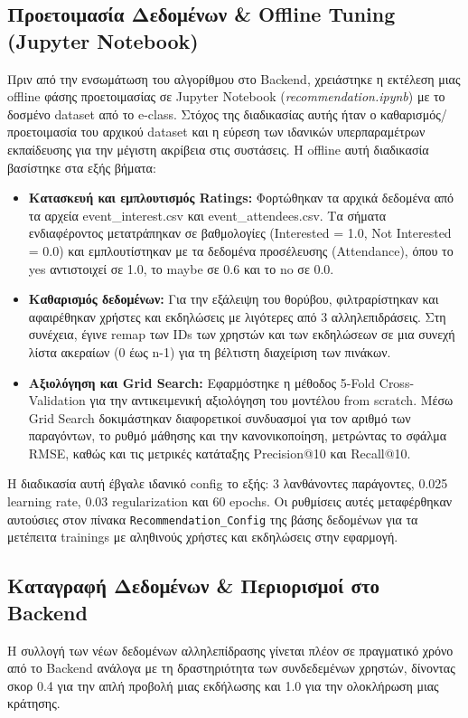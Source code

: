 \documentclass[12pt]{fphw}
\newcommand{\en}[1]{\foreignlanguage{english}{#1}}
\begin{document}
\subsection{Προετοιμασία Δεδομένων \& Offline Tuning (Jupyter Notebook)}
Πριν από την ενσωμάτωση του αλγορίθμου στο \en{Backend}, χρειάστηκε η εκτέλεση μιας offline φάσης προετοιμασίας σε \en{Jupyter Notebook} (\textit{recommendation.ipynb}) με το δοσμένο dataset από το e-class. Στόχος της διαδικασίας αυτής ήταν ο καθαρισμός/προετοιμασία του αρχικού \en{dataset} και η εύρεση των ιδανικών υπερπαραμέτρων εκπαίδευσης για την μέγιστη ακρίβεια στις συστάσεις. Η offline αυτή διαδικασία βασίστηκε στα εξής βήματα:
\begin{itemize}[leftmargin=*]
    \item \textbf{Κατασκευή και εμπλουτισμός Ratings:} Φορτώθηκαν τα αρχικά δεδομένα από τα αρχεία \en{event\_interest.csv} και \en{event\_attendees.csv}. Τα σήματα ενδιαφέροντος μετατράπηκαν σε βαθμολογίες (\en{Interested} = 1.0, \en{Not Interested} = 0.0) και εμπλουτίστηκαν με τα δεδομένα προσέλευσης (\en{Attendance}), όπου το \en{yes} αντιστοιχεί σε 1.0, το \en{maybe} σε 0.6 και το \en{no} σε 0.0.
    \item \textbf{Καθαρισμός δεδομένων:} Για την εξάλειψη του θορύβου, φιλτραρίστηκαν και αφαιρέθηκαν χρήστες και εκδηλώσεις με λιγότερες από 3 αλληλεπιδράσεις. Στη συνέχεια, έγινε \en{remap} των \en{IDs} των χρηστών και των εκδηλώσεων σε μια συνεχή λίστα ακεραίων (0 έως n-1) για τη βέλτιστη διαχείριση των πινάκων.
    \item \textbf{Αξιολόγηση και \en{Grid Search}:} Εφαρμόστηκε η μέθοδος \en{5-Fold Cross-Validation} για την αντικειμενική αξιολόγηση του μοντέλου \en{from scratch}. Μέσω \en{Grid Search} δοκιμάστηκαν διαφορετικοί συνδυασμοί για τον αριθμό των παραγόντων, το ρυθμό μάθησης και την κανονικοποίηση, μετρώντας το σφάλμα \en{RMSE}, καθώς και τις μετρικές κατάταξης \en{Precision@10} και \en{Recall@10}.
\end{itemize}
Η διαδικασία αυτή έβγαλε ιδανικό \en{config} το εξής: 3 λανθάνοντες παράγοντες, 0.025 learning rate, 0.03 regularization και 60 epochs. Οι ρυθμίσεις αυτές μεταφέρθηκαν αυτούσιες στον πίνακα \en{\texttt{Recommendation\_Config}} της βάσης δεδομένων για τα μετέπειτα \en{trainings} με αληθινούς χρήστες και εκδηλώσεις στην εφαρμογή.

\subsection{Καταγραφή Δεδομένων \& Περιορισμοί στο Backend}
Η συλλογή των νέων δεδομένων αλληλεπίδρασης γίνεται πλέον σε πραγματικό χρόνο από το \en{Backend} ανάλογα με τη δραστηριότητα των συνδεδεμένων χρηστών, δίνοντας σκορ 0.4 για την απλή προβολή μιας εκδήλωσης και 1.0 για την ολοκλήρωση μιας κράτησης.
\end{document}
